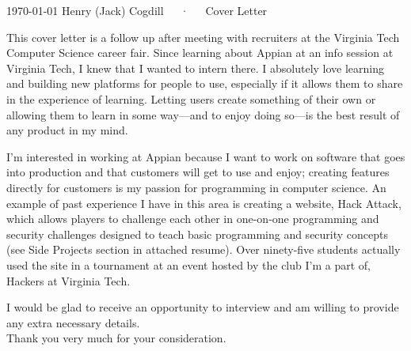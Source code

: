 \documentclass[11pt, letterpaper]{awesome-cv}
\begin{document}
\makecvheader[C]

\makecvfooter
  {\today}
  {Henry (Jack) Cogdill~~~·~~~Cover Letter}
  {}

\makelettertitle

\begin{cvletter}

This cover letter is a follow up after meeting with recruiters at the Virginia Tech Computer Science career fair. Since learning about Appian at an info session at Virginia Tech, I knew that I wanted to intern there. I absolutely love learning and building new platforms for people to use, especially if it allows them to share in the experience of learning. Letting users create something of their own or allowing them to learn in some way—and to enjoy doing so—is the best result of any product in my mind.

    I'm interested in working at Appian because I want to work on software that goes into production and that customers will get to use and enjoy; creating features directly for customers is my passion for programming in computer science. An example of past experience I have in this area is creating a website, Hack Attack, which allows players to challenge each other in one-on-one programming and security challenges designed to teach basic programming and security concepts (see Side Projects section in attached resume). Over ninety-five students actually used the site in a tournament at an event hosted by the club I'm a part of, Hackers at Virginia Tech.

I would be glad to receive an opportunity to interview and am willing to provide any extra necessary details. \\ Thank you very much for your consideration.

\end{cvletter}


\makeletterclosing
\end{document}
